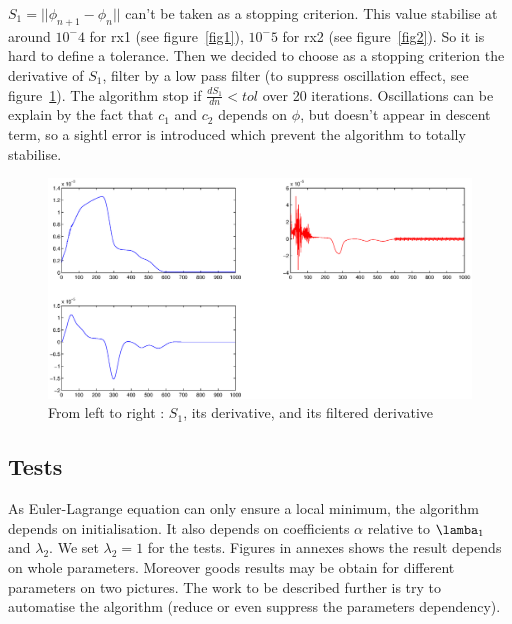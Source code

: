 $S_1 = ||{\phi_{n+1}-\phi_n}||$ can't be taken as a stopping criterion. This value stabilise at around $10^-4$ for rx1 (see figure~\ref{fig1}), $10^-5$ for rx2 (see figure~\ref{fig2}). So it is hard to define a tolerance.
Then we decided to choose as a stopping criterion the derivative of $S_1$, filter by a low pass filter (to suppress oscillation effect, see figure~\ref{fig3}). The algorithm stop if $\frac {dS_1} {dn} < tol$ over 20 iterations. 
Oscillations can be explain by the fact that $c_1$ and $c_2$ depends on $\phi$, but doesn't appear in descent term, so a sightl error is introduced which prevent the algorithm to totally stabilise.

\begin{figure}[H]
\centering
\includegraphics[scale=0.4]{images/crit_it_rx2_t2.eps}
\caption{From left to right : $S_1$, its derivative, and its filtered derivative}
\label{fig3}
\end{figure}

\subsection{Tests}

As Euler-Lagrange equation can only ensure a local minimum, the algorithm depends on initialisation.
It also depends on coefficients $\alpha$ relative to $\lamba_1$ and $\lambda_2$. We set $\lambda_2 = 1$ for the tests.
Figures %
in annexes shows the result depends on whole parameters.
Moreover goods results may be obtain for different parameters on two pictures.
The work to be described further is try to automatise the algorithm (reduce or even suppress the parameters dependency).

